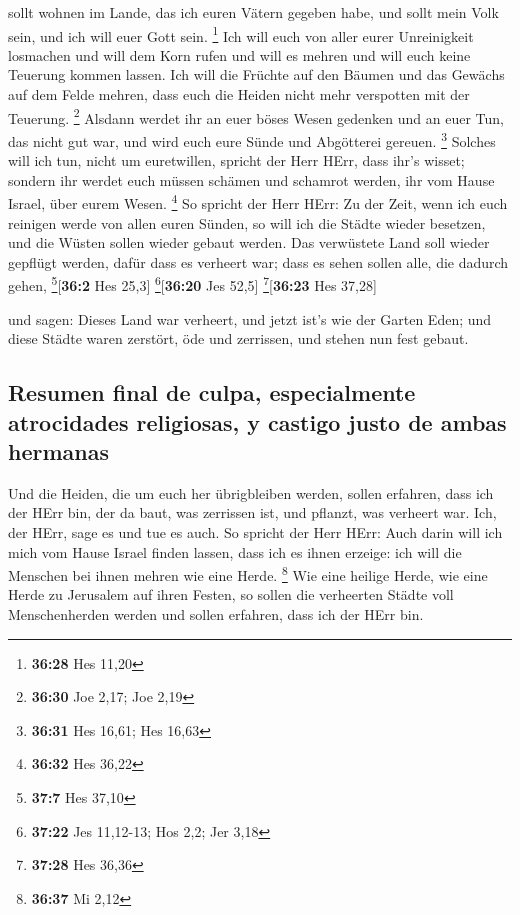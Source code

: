 sollt wohnen im Lande, das ich euren Vätern gegeben habe, und sollt mein
Volk sein, und ich will euer Gott sein. \footnote{\textbf{36:28} Hes
  11,20}  Ich will euch von aller eurer Unreinigkeit
losmachen und will dem Korn rufen und will es mehren und will euch keine
Teuerung kommen lassen.  Ich will die Früchte auf den
Bäumen und das Gewächs auf dem Felde mehren, dass euch die Heiden nicht
mehr verspotten mit der Teuerung. \footnote{\textbf{36:30} Joe 2,17; Joe
  2,19}  Alsdann werdet ihr an euer böses Wesen gedenken
und an euer Tun, das nicht gut war, und wird euch eure Sünde und
Abgötterei gereuen. \footnote{\textbf{36:31} Hes 16,61; Hes 16,63}
 Solches will ich tun, nicht um euretwillen, spricht der
Herr HErr, dass ihr's wisset; sondern ihr werdet euch müssen schämen und
schamrot werden, ihr vom Hause Israel, über eurem Wesen. \footnote{\textbf{36:32}
  Hes 36,22}  So spricht der Herr HErr: Zu der Zeit, wenn
ich euch reinigen werde von allen euren Sünden, so will ich die Städte
wieder besetzen, und die Wüsten sollen wieder gebaut werden.
 Das verwüstete Land soll wieder gepflügt werden, dafür
dass es verheert war; dass es sehen sollen alle, die dadurch gehen,
\footnote{\textbf{37:7} Hes 37,10}{[}\textbf{36:2} Hes 25,3{]}
\footnote{\textbf{37:22} Jes 11,12-13; Hos 2,2; Jer 3,18}{[}\textbf{36:20}
Jes 52,5{]} \footnote{\textbf{37:28} Hes 36,36}{[}\textbf{36:23} Hes
37,28{]}

 und sagen: Dieses Land war verheert, und jetzt ist's wie
der Garten Eden; und diese Städte waren zerstört, öde und zerrissen, und
stehen nun fest gebaut.

\hypertarget{resumen-final-de-culpa-especialmente-atrocidades-religiosas-y-castigo-justo-de-ambas-hermanas}{%
\subsection{Resumen final de culpa, especialmente atrocidades
religiosas, y castigo justo de ambas
hermanas}\label{resumen-final-de-culpa-especialmente-atrocidades-religiosas-y-castigo-justo-de-ambas-hermanas}}

 Und die Heiden, die um euch her übrigbleiben werden,
sollen erfahren, dass ich der HErr bin, der da baut, was zerrissen ist,
und pflanzt, was verheert war. Ich, der HErr, sage es und tue es auch.
 So spricht der Herr HErr: Auch darin will ich mich vom
Hause Israel finden lassen, dass ich es ihnen erzeige: ich will die
Menschen bei ihnen mehren wie eine Herde. \footnote{\textbf{36:37} Mi
  2,12}  Wie eine heilige Herde, wie eine Herde zu
Jerusalem auf ihren Festen, so sollen die verheerten Städte voll
Menschenherden werden und sollen erfahren, dass ich der HErr bin.

